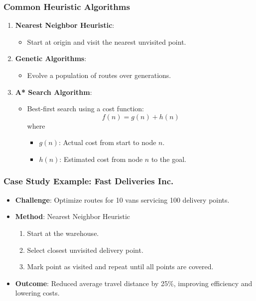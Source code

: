 \documentclass[aspectratio=169]{beamer}
\begin{document}
\begin{frame}[fragile]
    \frametitle{Common Heuristic Algorithms}
    \begin{enumerate}
        \item \textbf{Nearest Neighbor Heuristic}:
            \begin{itemize}
                \item Start at origin and visit the nearest unvisited point.
            \end{itemize}
        \item \textbf{Genetic Algorithms}:
            \begin{itemize}
                \item Evolve a population of routes over generations.
            \end{itemize}
        \item \textbf{A* Search Algorithm}:
            \begin{itemize}
                \item Best-first search using a cost function: 
                \begin{equation}
                    f(n) = g(n) + h(n)
                \end{equation}
                where 
                \begin{itemize}
                    \item $g(n)$: Actual cost from start to node $n$.
                    \item $h(n)$: Estimated cost from node $n$ to the goal.
                \end{itemize}
            \end{itemize}
    \end{enumerate}
\end{frame}

\begin{frame}[fragile]
    \frametitle{Case Study Example: Fast Deliveries Inc.}
    \begin{itemize}
        \item \textbf{Challenge}: Optimize routes for 10 vans servicing 100 delivery points.
        \item \textbf{Method}: Nearest Neighbor Heuristic
            \begin{enumerate}
                \item Start at the warehouse.
                \item Select closest unvisited delivery point.
                \item Mark point as visited and repeat until all points are covered.
            \end{enumerate}
        \item \textbf{Outcome}: Reduced average travel distance by 25\%, improving efficiency and lowering costs.
    \end{itemize}
\end{frame}
\end{document}
